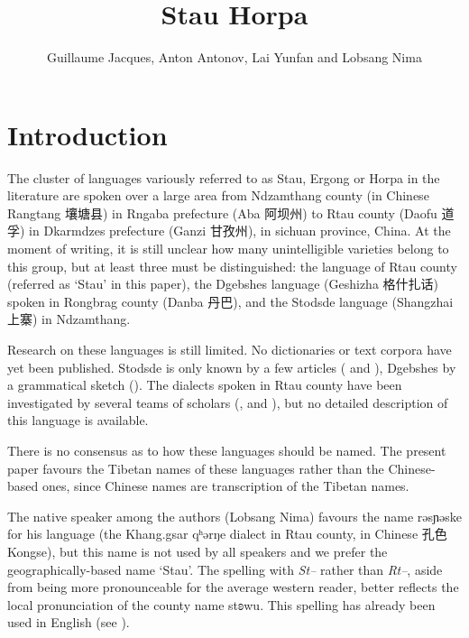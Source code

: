 \documentclass[oneside,a4paper,11pt]{article}
\newcommand{\ipa}[1]{{\phon #1}} %
\newcommand{\zh}[1]{{\cn #1}}
\begin{document}
 


\title{Stau Horpa}
\author{Guillaume Jacques, Anton Antonov, Lai Yunfan and Lobsang Nima}

\maketitle

 

\section{Introduction}
The cluster of languages variously referred to as Stau, Ergong or Horpa in the literature are spoken over a large area from Ndzamthang county (in Chinese Rangtang  \zh{壤塘县})  in Rngaba  prefecture (Aba \zh{阿坝州}) to Rtau county (Daofu \zh{道孚}) in Dkarmdzes prefecture (Ganzi \zh{甘孜州}), in sichuan province, China. At the moment of writing, it is still unclear how many unintelligible varieties belong to this group, but at least three must be distinguished: the language of Rtau county (referred as `Stau' in this paper), the Dgebshes language (Geshizha \zh{格什扎话})  spoken in Rongbrag county (Danba \zh{丹巴}), and the Stodsde language (Shangzhai \zh{上寨}) in Ndzamthang.  

Research on these languages is still limited. No dictionaries or text corpora have yet been published. Stodsde is only known by a few articles (\citealt{jackson00sidaba} and   \citealt{jackson07shangzhai}), Dgebshes by a grammatical sketch (\citealt{duoerji98geshizha}). The dialects spoken in Rtau county have been investigated by several teams of scholars (\citealt{huangbf91daofu}, \citealt{sun13gexi} and \citealt{jacques14rtau}), but no detailed description of this language is available.

There is no consensus as to how these languages should be named. The present paper favours the Tibetan names of these languages rather than the Chinese-based ones, since Chinese names are transcription of the Tibetan names. 

  The native speaker among the authors (Lobsang Nima) favours the name \ipa{rəsɲəske} for his language (the Khang.gsar \ipa{qʰərŋe} dialect in Rtau county, in Chinese \zh{孔色} Kongse), but this name is not used by all speakers and we prefer the geographically-based name  `Stau'. The spelling with \textit{St--} rather than \textit{Rt--}, aside from being more pronounceable for the average western reader, better reflects the local pronunciation of the county name \ipa{stʚwu}. This spelling has already been used in English (see \citealt{wang70stau}).   
  
\end{document}
